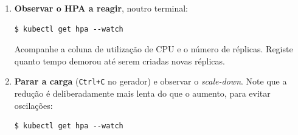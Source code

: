 \documentclass[11pt,a4paper]{article}
\begin{document}
\begin{enumerate}[label=\arabic*.,resume]
  \item \textbf{Observar o HPA a reagir}, noutro terminal:
\begin{lstlisting}
$ kubectl get hpa --watch
\end{lstlisting}
  Acompanhe a coluna de utilização de CPU e o número de réplicas. Registe quanto tempo demorou até serem criadas novas réplicas.

  \item \textbf{Parar a carga} (\texttt{Ctrl+C} no gerador) e observar o \emph{scale-down}. Note que a redução é deliberadamente mais lenta do que o aumento, para evitar oscilações:
\begin{lstlisting}
$ kubectl get hpa --watch
\end{lstlisting}

\end{enumerate}
\end{document}
